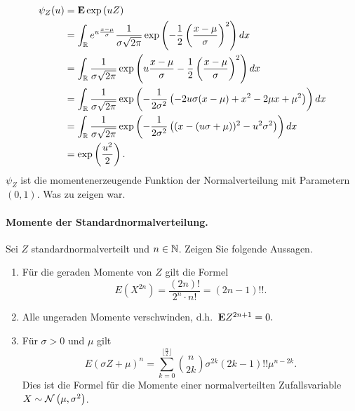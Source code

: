 \begin{align*}
    \psi_{Z}(u) &= \mathbf{E} \exp \left( u Z \right) \\
    &= \int_{\mathbb R} e^{u \frac{x-\mu}{\sigma}} \frac{1}{\sigma \sqrt{2\pi}}
    \exp \left( -\frac{1}{2} \left( \frac{x-\mu}{\sigma} \right)^2 \right) dx \\
    &= \int_{\mathbb R} \frac{1}{\sigma\sqrt{2\pi}} 
    \exp \left(  u \frac{x-\mu}{\sigma} -\frac{1}{2} \left( \frac{x-\mu}{\sigma} \right)^2 \right) dx \\
    &= \int_{\mathbb R} \frac{1}{\sigma\sqrt{2\pi}} 
    \exp \left( -\frac{1}{2\sigma^2} \left( 
    -2 u \sigma (x-\mu) + x^2 - 2 \mu x + \mu^2 
    \right) \right) dx \\
    &= \int_{\mathbb R} \frac{1}{\sigma\sqrt{2\pi}} 
    \exp \left( -\frac{1}{2\sigma^2} \left( 
    (x - (u\sigma+\mu))^2 - u^2 \sigma^2 \right) \right) dx \\
    &= \exp \left( \frac{u^2}{2} \right).
\end{align*}
$\psi_{Z}$ ist die momentenerzeugende Funktion der Normalverteilung mit 
Parametern $(0,1)$. Was zu zeigen war. 


\paragraph{Momente der Standardnormalverteilung. } 
Sei $Z$ standardnormalverteilt und $n\in\mathbb N$. Zeigen Sie folgende Aussagen.
\begin{enumerate}
    \item Für die geraden Momente von $Z$ gilt die Formel
        \begin{equation*}
            E\left( X^{2n} \right) = \frac{(2n)!}{2^n \cdot n!} = \left( 2n-1 \right)!!.
        \end{equation*}
    \item Alle ungeraden Momente verschwinden, d.h.\ $\mathbf{E} Z^{2n+1}=0.$
    \item Für $\sigma>0$ und $\mu$ gilt
        \begin{equation*}
            E \left( \sigma Z + \mu \right)^n = 
            \sum_{k=0}^{\lfloor\frac{n}{2}\rfloor} \binom{n}{2k} \sigma^{2k} \left( 2k-1 \right)!! \mu^{n-2k}.
        \end{equation*}
        Dies ist die Formel für die Momente einer normalverteilten
        Zufallsvariable $X \sim \mathcal N \left( \mu, \sigma^2 \right)$. 
\end{enumerate}

